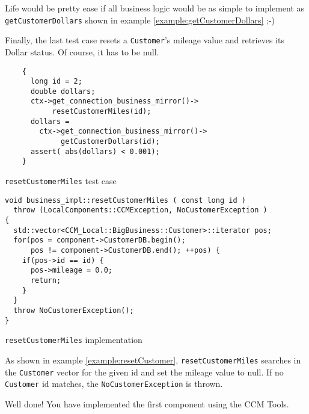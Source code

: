 Life would be pretty ease if all business logic would be as simple to implement 
as \\ 
{\tt getCustomerDollars} shown in example \ref{example:getCustomerDollars} 
;-)


\newpage
Finally, the last test case resets a {\tt Customer}'s mileage value and 
retrieves its Dollar status. Of course, it has to be null.

\begin{Example}
\begin{minifbox}
\begin{small}
\begin{verbatim}
    {
      long id = 2;
      double dollars;
      ctx->get_connection_business_mirror()->
           resetCustomerMiles(id);
      dollars = 
        ctx->get_connection_business_mirror()->
             getCustomerDollars(id); 
      assert( abs(dollars) < 0.001);
    }
\end{verbatim}
\end{small}
\end{minifbox}
\caption{{\tt resetCustomerMiles} test case}
\label{example:}
\end{Example}



\begin{Example}
\begin{minifbox}
\begin{small}
\begin{verbatim}
void business_impl::resetCustomerMiles ( const long id )
  throw (LocalComponents::CCMException, NoCustomerException )
{
  std::vector<CCM_Local::BigBusiness::Customer>::iterator pos;
  for(pos = component->CustomerDB.begin(); 
      pos != component->CustomerDB.end(); ++pos) {
    if(pos->id == id) {
      pos->mileage = 0.0;
      return;
    }
  }
  throw NoCustomerException(); 
}
\end{verbatim}
\end{small}
\end{minifbox}
\caption{{\tt resetCustomerMiles} implementation}
\label{example:resetCustomer}
\end{Example}
As shown in example \ref{example:resetCustomer}, {\tt resetCustomerMiles} 
searches in the {\tt Customer}
vector for the given id and set the mileage value to null.
If no {\tt Customer} id matches, the {\tt NoCustomerException} is thrown.

Well done! You have implemented the first component using the CCM Tools.


\newpage

